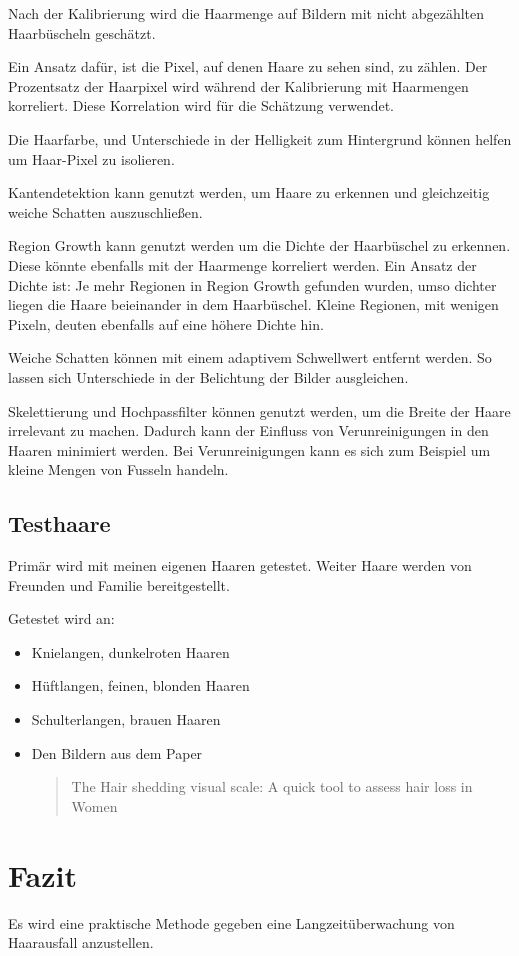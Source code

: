 \documentclass[german,a4paper,12pt]{llncs}
\begin{document}
Nach der Kalibrierung wird die Haarmenge auf Bildern mit nicht abgezählten Haarbüscheln geschätzt.

Ein Ansatz dafür, ist die Pixel, auf denen Haare zu sehen sind, zu zählen. Der Prozentsatz der Haarpixel wird während der Kalibrierung mit Haarmengen korreliert. Diese Korrelation wird für die Schätzung verwendet.
 
Die Haarfarbe, und Unterschiede in der Helligkeit zum Hintergrund können helfen um Haar-Pixel zu isolieren. 

Kantendetektion kann genutzt werden, um Haare zu erkennen und gleichzeitig weiche Schatten auszuschließen.  

Region Growth kann genutzt werden um die Dichte der Haarbüschel zu erkennen. Diese könnte ebenfalls mit der Haarmenge korreliert werden. Ein Ansatz der Dichte ist: Je mehr Regionen in Region Growth gefunden wurden, umso dichter liegen die Haare beieinander in dem Haarbüschel. Kleine Regionen, mit wenigen Pixeln, deuten ebenfalls auf eine höhere Dichte hin. 

Weiche Schatten können mit einem adaptivem Schwellwert entfernt werden. So lassen sich Unterschiede in der Belichtung der Bilder ausgleichen. 

Skelettierung und Hochpassfilter können genutzt werden, um die Breite der Haare irrelevant zu machen. Dadurch kann der Einfluss von Verunreinigungen in den Haaren minimiert werden. Bei Verunreinigungen kann es sich zum Beispiel um kleine Mengen von Fusseln handeln.

\subsection{Testhaare}

Primär wird mit meinen eigenen Haaren getestet. Weiter Haare werden von Freunden und Familie bereitgestellt.

Getestet wird an:
\begin{itemize}
	\item Knielangen, dunkelroten Haaren
	\item Hüftlangen, feinen, blonden Haaren
	\item Schulterlangen, brauen Haaren
	\item Den Bildern aus dem Paper \blockquote{The Hair shedding visual scale: A quick tool to assess hair loss in Women} 
\end{itemize}



\section{Fazit}
Es wird eine praktische Methode gegeben eine Langzeitüberwachung von Haarausfall anzustellen. 
\end{document}
